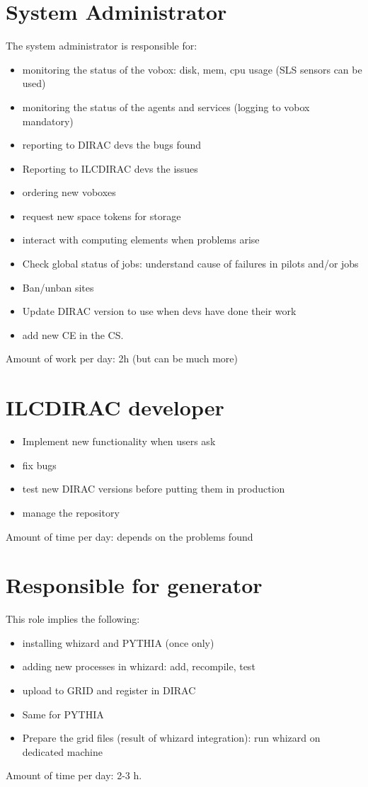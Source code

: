 \documentclass[12pt]{article}
\begin{document}
 \section{System Administrator}
 The system administrator is responsible for:
 \begin{itemize}
   \item monitoring the status of the vobox: disk, mem, cpu usage (SLS sensors
   can be used)
   \item monitoring the status of the agents and services (logging to vobox
   mandatory)
   \item reporting to DIRAC devs the bugs found
   \item Reporting to ILCDIRAC devs the issues
   \item ordering new voboxes
   \item request new space tokens for storage
   \item interact with computing elements when problems arise 
   \item Check global status of jobs: understand cause of failures in pilots
   and/or jobs
   \item Ban/unban sites
   \item Update DIRAC version to use when devs have done their work
   \item add new CE in the CS. 
 \end{itemize}
 Amount of work per day: 2h (but can be much more)
 
 \section{ILCDIRAC developer}
 \begin{itemize}
   \item Implement new functionality when users ask
   \item fix bugs
   \item test new DIRAC versions before putting them in production
   \item manage the repository
 \end{itemize}
 Amount of time per day: depends on the problems found
 
 \section{Responsible for generator}
 This role implies the following:
 \begin{itemize}
   \item installing whizard and PYTHIA (once only)
   \item adding new processes in whizard: add, recompile, test
   \item upload to GRID and register in DIRAC 
   \item Same for PYTHIA
   \item Prepare the grid files (result of whizard integration): run whizard on
   dedicated machine
 \end{itemize}
 Amount of time per day: 2-3 h.
\end{document}
